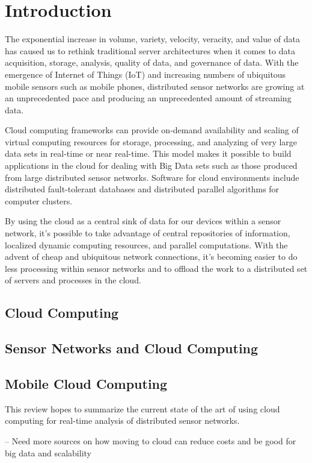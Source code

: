 \chapter{Introduction}
The exponential increase in volume, variety, velocity, veracity, and value of data has caused us to rethink traditional server architectures when it comes to data acquisition, storage, analysis, quality of data, and governance of data. With the emergence of Internet of Things (IoT) and increasing numbers of ubiquitous mobile sensors such as mobile phones, distributed sensor networks are growing at an unprecedented pace and producing an unprecedented amount of streaming data.

Cloud computing frameworks can provide on-demand availability and scaling of virtual computing resources for storage, processing, and analyzing of very large data sets in real-time or near real-time. This model makes it possible to build applications in the cloud for dealing with Big Data sets such as those produced from large distributed sensor networks. Software for cloud environments include distributed fault-tolerant databases and distributed parallel algorithms for computer clusters. 

By using the cloud as a central sink of data for our devices within a sensor network, it's possible to take advantage of central repositories of information, localized dynamic computing resources, and parallel computations.  With the advent of cheap and ubiquitous network connections, it's becoming easier to do less processing within sensor networks and to offload the work to a distributed set of servers and processes in the cloud\cite{kamburugamuve_framework_2015}.

\section{Cloud Computing}

\section{Sensor Networks and Cloud Computing}

\section{Mobile Cloud Computing}

This review hopes to summarize the current state of the art of using cloud computing for real-time analysis of distributed sensor networks. 

-- Need more sources on how moving to cloud can reduce costs and be good for big data and scalability